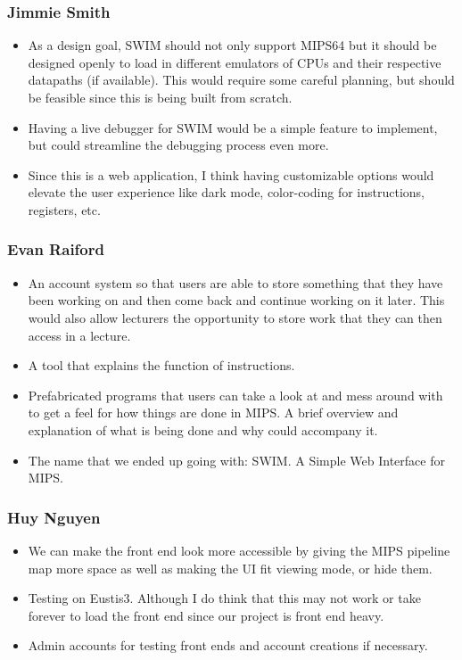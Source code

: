 \documentclass[
    paper=letter,
    parskip=half,
    fontsize=12pt,
    titlepage=firstiscover,
    toc=bibliography,
    numbers=endperiod
]{scrartcl}
\begin{document}
\subsubsection{Jimmie Smith}
\begin{itemize}
    \item As a design goal, SWIM should not only support MIPS64 but it should be designed openly to load in different emulators of CPUs and their respective datapaths (if available). This would require some careful planning, but should be feasible since this is being built from scratch.
    \item Having a live debugger for SWIM would be a simple feature to implement, but could streamline the debugging process even more.
    \item Since this is a web application, I think having customizable options would elevate the user experience like dark mode, color-coding for instructions, registers, etc.
\end{itemize}

\subsubsection{Evan Raiford}
\begin{itemize}
    \item An account system so that users are able to store something that they have been working on and then come back and continue working on it later. This would also allow lecturers the opportunity to store work that they can then access in a lecture.
    \item A tool that explains the function of instructions.
    \item Prefabricated programs that users can take a look at and mess around with to get a feel for how things are done in MIPS. A brief overview and explanation of what is being done and why could accompany it.
    \item The name that we ended up going with: SWIM. A Simple Web Interface for MIPS.
\end{itemize}

\subsubsection{Huy Nguyen}
\begin{itemize}
    \item We can make the front end look more accessible by giving the MIPS pipeline map more space as well as making the UI fit viewing mode, or hide them.
    \item Testing on Eustis3. Although I do think that this may not work or take forever to load the front end since our project is front end heavy.
    \item Admin accounts for testing front ends and account creations if necessary.
\end{itemize}
\end{document}
